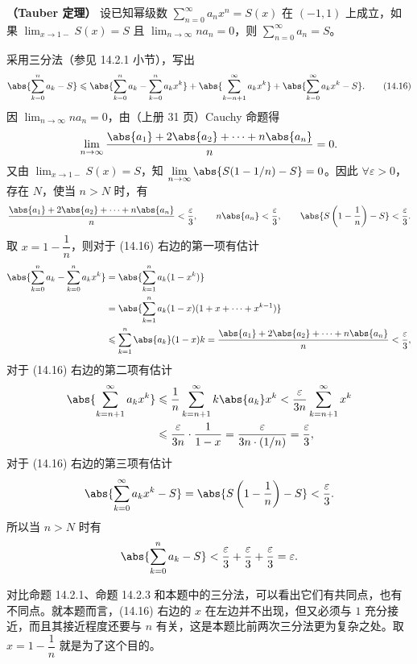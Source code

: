 \begin{xproposition}[14.3.4]
\textbf{（Tauber 定理）} 设已知幂级数 $\displaystyle\sum_{n=0}^{\infty}a_nx^n=S(x)$ 在 $(-1,1)$ 上成立，如果 $\displaystyle\lim_{x\to1-}S(x)=S$ 且 $\displaystyle\lim_{n\to\infty}na_n=0$，则 $\displaystyle\sum_{n=0}^{\infty}a_n=S$。
\end{xproposition}
\begin{xproof}
采用三分法（参见 14.2.1 小节），写出
\begin{equation}
  \abs{\sum_{k=0}^{n}a_k-S}
  \leqslant
  \abs{\sum_{k=0}^{n}a_k-\sum_{k=0}^{n}a_kx^k}
  +\abs{\sum_{k=n+1}^{\infty}a_kx^k}
  +\abs{\sum_{k=0}^{\infty}a_kx^k-S}.
  \tag{14.16}
  \label{eq:14.16}
\end{equation}
因 $\displaystyle\lim_{n\to\infty}na_n=0$，由（上册 31 页）Cauchy 命题得
\[
  \lim_{n\to\infty}\frac{\abs{a_1}+2\abs{a_2}+\cdots+n\abs{a_n}}{n}=0.
\]
又由 $\displaystyle\lim_{x\to1-}S(x)=S$，知 $\displaystyle\lim_{n\to\infty}\abs{S(1-1/n)-S}=0$。因此 $\forall\varepsilon>0$，存在 $N$，使当 $n>N$ 时，有
\[
  \frac{\abs{a_1}+2\abs{a_2}+\cdots+n\abs{a_n}}{n}<\frac\varepsilon3,
  \qquad n\abs{a_n}<\frac\varepsilon3,
  \qquad \abs{S\left(1-\frac1n\right)-S}<\frac\varepsilon3.
\]
取 $x=1-\dfrac1n$，则对于 (14.16) 右边的第一项有估计
\[
\begin{aligned}
  \abs{\sum_{k=0}^{n}a_k-\sum_{k=0}^{n}a_kx^k}
  &=\abs{\sum_{k=1}^{n}a_k(1-x^k)}\\
  &=\abs{\sum_{k=1}^{n}a_k(1-x)(1+x+\cdots+x^{k-1})}\\
  &\leqslant\sum_{k=1}^{n}\abs{a_k}(1-x)k
  =\frac{\abs{a_1}+2\abs{a_2}+\cdots+n\abs{a_n}}{n}<\frac\varepsilon3,
\end{aligned}
\]
对于 (14.16) 右边的第二项有估计
\[
\begin{aligned}
  \abs{\sum_{k=n+1}^{\infty}a_kx^k}
  &\leqslant\frac1n\sum_{k=n+1}^{\infty}k\abs{a_k}x^k
  <\frac\varepsilon{3n}\sum_{k=n+1}^{\infty}x^k\\
  &\leqslant\frac\varepsilon{3n}\cdot\frac1{1-x}
  =\frac\varepsilon{3n\cdot(1/n)}=\frac\varepsilon3,
\end{aligned}
\]
对于 (14.16) 右边的第三项有估计
\[
  \abs{\sum_{k=0}^{\infty}a_kx^k-S}=\abs{S\left(1-\frac1n\right)-S}<\frac\varepsilon3.
\]
所以当 $n>N$ 时有
\[
  \abs{\sum_{k=0}^{n}a_k-S}<\frac\varepsilon3+\frac\varepsilon3+\frac\varepsilon3=\varepsilon.
\]
\end{xproof}

\begin{xremark}
对比命题 14.2.1、命题 14.2.3 和本题中的三分法，可以看出它们有共同点，也有不同点。就本题而言，(14.16) 右边的 $x$ 在左边并不出现，但又必须与 $1$ 充分接近，而且其接近程度还要与 $n$ 有关，这是本题比前两次三分法更为复杂之处。取 $x=1-\dfrac1n$ 就是为了这个目的。
\end{xremark}

